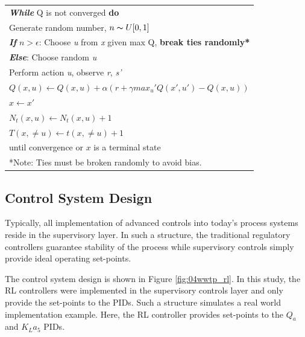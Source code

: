 \begin{table}[h]
\begin{tabular}{p{14cm}}
		\hspace{1cm} \textbf{\emph{While}} Q is not converged \textbf{do} \\
		\hspace{2cm} Generate random number, $n \thicksim U[0, 1]$ \\
		\hspace{2cm} \textbf{\emph{If}} $n > \epsilon$: Choose \emph{u} from \emph{x} given max Q, \textbf{break ties randomly*} \\
		\hspace{2cm} \textbf{\emph{Else}}: Choose random \emph{u} \\
		\hspace{2cm} Perform action \emph{u}, observe \emph{r}, \emph{s'} \\
		\hspace{2cm} $Q(x, u) \leftarrow Q(x, u) + \alpha(r + \gamma max_u' Q(x', u') - Q(x, u))$ \\
		\hspace{2cm} $x \leftarrow x'$ \\
		\hspace{2cm} $N_t(x, u) \leftarrow N_t(x, u) + 1$ \\
		\hspace{2cm} $T(x, \neq u) \leftarrow t(x, \neq u) + 1$ \\
		\hspace{1cm} until convergence or $x$ is a terminal state \\ \hline
		*Note: Ties must be broken randomly to avoid bias.
	\end{tabular}
\end{table}

\subsection{Control System Design}
Typically, all implementation of advanced controls into today's process systems reside in the supervisory layer. In such a structure, the traditional regulatory controllers guarantee stability of the process while supervisory controls simply provide ideal operating set-points.

The control system design is shown in Figure \ref{fig:04wwtp_rl}. In this study, the RL controllers were implemented in the supervisory controls layer and only provide the set-points to the PIDs. Such a structure simulates a real world implementation example. Here, the RL controller provides set-points to the $Q_a$ and $K_La_5$ PIDs.


